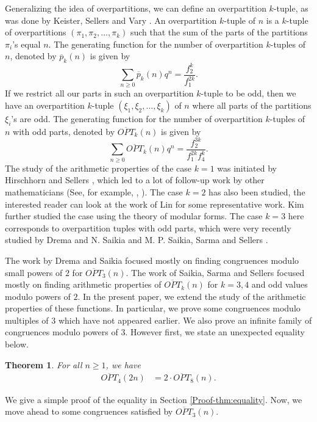 \documentclass[12pt,reqno]{amsart}
\numberwithin{equation}{section}
\newcommand{\op}{\overline{p}}
\newcommand{\opt}{\overline{OPT}}
\newtheorem{theorem}{Theorem}[section]
\begin{document}
Generalizing the idea of overpartitions, we can define an overpartition $k$-tuple, as was done by Keister, Sellers and Vary \cite{KeisterSellersVary}. An overpartition $k$-tuple of $n$ is a $k$-tuple of overpartitions $(\pi_1, \pi_2, \ldots, \pi_k)$ such that the sum of the parts of the partitions $\pi_i$'s equal $n$. The generating function for the number of overpartition $k$-tuples of $n$, denoted by $\op_k(n)$ is given by
\[
\sum_{n\geq 0}\op_k(n)q^n=\frac{f_{2}^k}{f_{1}^{2k}}.
\]
If we restrict all our parts in such an overpartition $k$-tuple to be odd, then we have an overpartition $k$-tuple $(\xi_1, \xi_2, \ldots, \xi_k)$ of $n$ where all parts of the partitions $\xi_i$'s are odd. The generating function for the number of overpartition $k$-tuples of $n$ with odd parts, denoted by $\opt_k(n)$ is given by
\begin{equation}\label{opt}
    \sum_{n\geq 0}\opt_k(n)q^n=\frac{f_{2}^{3k}}{f_{1}^{2k}f_{4}^{k}}.
\end{equation}
The study of the arithmetic properties of the case $k=1$ was initiated by Hirschhorn and Sellers \cite{HSellers}, which led to a lot of follow-up work by other mathematicians (See, for example, \cite{zchen}, \cite{zMerca}). The case $k=2$ has also been studied, the interested reader can look at the work of Lin \cite{Lin} for some representative work. Kim \cite{zBkim} further studied the case using the theory of modular forms. The case $k=3$ here corresponds to overpartition tuples with odd parts, which were very recently studied by Drema and N. Saikia \cite{DremaSaikia} and M. P. Saikia, Sarma and Sellers \cite{SSS}.

The work by Drema and Saikia \cite{DremaSaikia} focused mostly on finding congruences modulo small powers of $2$ for $\opt_3(n)$. The work of Saikia, Sarma and Sellers \cite{SSS} focused mostly on finding arithmetic properties of $\opt_k(n)$ for $k=3, 4$ and odd values modulo powers of $2$. In the present paper, we extend the study of the arithmetic properties of these functions. In particular, we prove some congruences modulo multiples of $3$ which have not appeared earlier. We also prove an infinite family of congruences modulo powers of $3$. However first, we state an unexpected equality below.
\begin{theorem}\label{thm:equality}
     For all $n\geq 1$, we have
     \begin{align*}
         \opt_4(2n)&=2\cdot \opt_8(n).
     \end{align*}
\end{theorem}
\noindent We give a simple proof of the equality in Section \ref{Proof-thm:equality}. Now, we move ahead to some congruences satisfied by $\opt_3(n)$.
\end{document}
